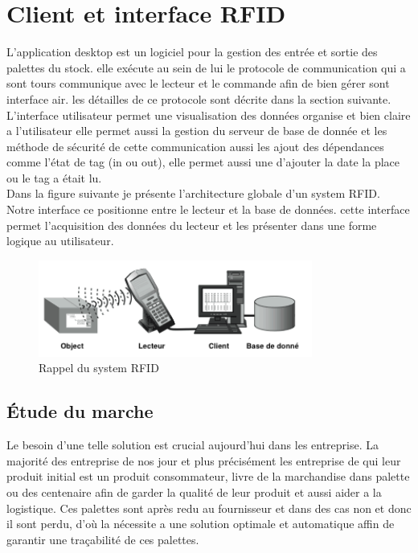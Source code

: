 \documentclass[11pt, a4paper, twoside]{book}
\begin{document}
\section{Client et interface RFID}

L'application desktop  est un logiciel pour la gestion des entrée et sortie des palettes du stock. elle exécute au sein de lui le protocole de communication  qui a sont tours communique avec le lecteur et le commande  afin de bien gérer sont interface air. les détailles de ce protocole sont décrite dans la section suivante. L'interface utilisateur  permet  une visualisation des données organise et bien claire a l'utilisateur elle permet aussi  la gestion du serveur de base de donnée et les méthode de sécurité de cette communication aussi les ajout des dépendances comme l'état de tag (in ou out), elle permet aussi une d'ajouter la date la place ou le tag a était lu.\\

Dans la figure suivante je présente l'architecture globale d'un system RFID. Notre interface ce positionne entre le lecteur et la base de données. cette interface permet l'acquisition des données du lecteur et les présenter dans une forme logique au utilisateur.

\begin{figure}[H]
\centering
\includegraphics[width=9cm]{systemx}
\caption{Rappel du system RFID}
\end{figure}

\subsection{Étude du marche}
Le besoin d'une telle solution est crucial aujourd'hui dans les entreprise. La majorité des entreprise de nos jour et plus précisément les entreprise de qui leur produit initial est un produit consommateur, livre de la marchandise dans palette ou des centenaire afin de garder la qualité de leur produit et aussi aider a la logistique. Ces palettes sont après redu au fournisseur et dans des cas non et donc il sont perdu, d'où la nécessite a une solution optimale et automatique affin de garantir une traçabilité de ces palettes.
\end{document}

